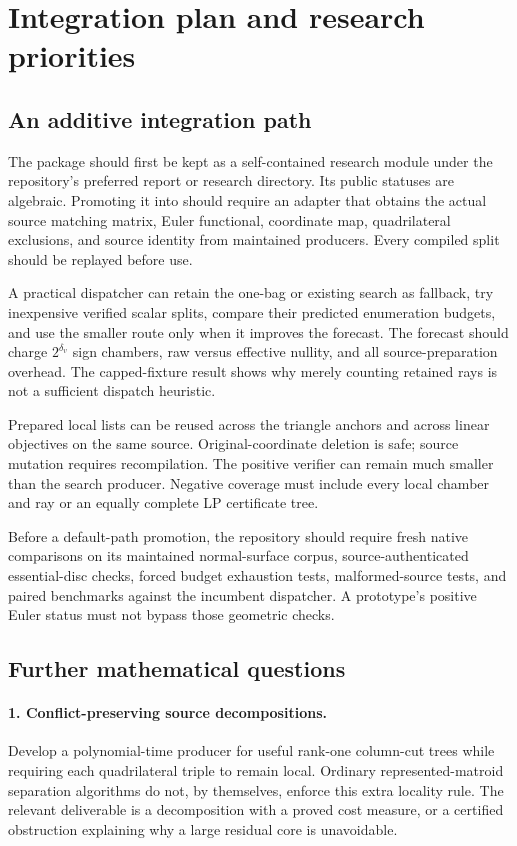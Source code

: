 \section{Integration plan and research priorities}
\label{sec:future}

\subsection{An additive integration path}

The package should first be kept as a self-contained research module under the
repository's preferred report or research directory. Its public statuses are
algebraic. Promoting it into  should require an adapter that
obtains the actual source matching matrix, Euler functional, coordinate map,
quadrilateral exclusions, and source identity from maintained producers.
Every compiled split should be replayed before use.

A practical dispatcher can retain the one-bag or existing search as fallback,
try inexpensive verified scalar splits, compare their predicted enumeration
budgets, and use the smaller route only when it improves the forecast.
The forecast should charge $2^{\delta_v}$ sign chambers, raw versus effective
nullity, and all source-preparation overhead. The capped-fixture result shows
why merely counting retained rays is not a sufficient dispatch heuristic.

Prepared local lists can be reused across the triangle anchors and across
linear objectives on the same source. Original-coordinate deletion is safe;
source mutation requires recompilation. The positive verifier can remain much
smaller than the search producer. Negative coverage must include every local
chamber and ray or an equally complete LP certificate tree.

Before a default-path promotion, the repository should require fresh native
comparisons on its maintained normal-surface corpus, source-authenticated
essential-disc checks, forced budget exhaustion tests, malformed-source tests,
and paired benchmarks against the incumbent dispatcher. A prototype's positive
Euler status must not bypass those geometric checks.

\subsection{Further mathematical questions}

\paragraph{1. Conflict-preserving source decompositions.}
Develop a polynomial-time producer for useful rank-one column-cut trees while
requiring each quadrilateral triple to remain local. Ordinary represented-matroid
separation algorithms do not, by themselves, enforce this extra locality rule.
The relevant deliverable is a decomposition with a proved cost measure, or a
certified obstruction explaining why a large residual core is unavoidable.

